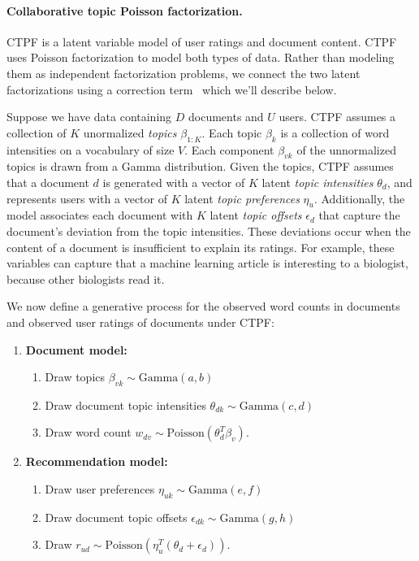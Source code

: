 \documentclass{article}
\newcommand{\Gam}{\textrm{Gamma}}
\newcommand{\Pois}{\textrm{Poisson}}
\begin{document}
\paragraph{Collaborative topic Poisson factorization.} 
CTPF is a latent variable model of user ratings and document content.
CTPF uses Poisson factorization to model both types of data. Rather
than modeling them as independent factorization problems, we connect
the two latent factorizations using a correction
term~\cite{Wang:2011a} which we'll describe below.

Suppose we have data containing $D$ documents and $U$ users. CTPF
assumes a collection of $K$ unormalized \emph{topics} $\beta_{1:K}$. Each topic
$\beta_k$ is a collection of word intensities on a vocabulary of size
$V$. Each component $\beta_{vk}$ of the unnormalized topics is drawn
from a Gamma distribution. Given the topics, CTPF assumes that a
document $d$ is generated with a vector of $K$ latent \emph{topic
  intensities} $\theta_d$, and represents users with a vector of $K$
latent \emph{topic preferences} $\eta_u$.  Additionally, the model
associates each document with $K$ latent \emph{topic offsets}
$\epsilon_d$ that capture the document's deviation from the topic
intensities. These deviations occur when the content of a document is
insufficient to explain its ratings. For example, these variables can
capture that a machine learning article is interesting to a biologist,
because other biologists read it.

We now define a generative process for the observed word counts in
documents and observed user ratings of documents under CTPF:
\begin{enumerate}
\item {\bf Document model:}
\begin{enumerate}
\item Draw topics $\beta_{vk} \sim \Gam(a, b)$
\item Draw document topic intensities $\theta_{dk} \sim \Gam(c, d)$
\item Draw word count $w_{dv} \sim \Pois(\theta_d^T \beta_v)$.
\end{enumerate}

\item {\bf Recommendation model:}
\begin{enumerate}
\item Draw user preferences $\eta_{uk} \sim \Gam(e, f)$
\item Draw document topic offsets $\epsilon_{dk} \sim \Gam(g, h)$
\item Draw $r_{ud} \sim \Pois(\eta_u^T (\theta_d + \epsilon_d))$.
\end{enumerate}
\end{enumerate}
\end{document}
